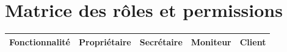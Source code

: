 \documentclass[12pt,a4paper]{article}
\begin{document}
\newpage

\section{Matrice des rôles et permissions}

\renewcommand{\arraystretch}{1.4}
\begin{longtable}{p{4.8cm} >{\centering\arraybackslash}p{2.3cm} >{\centering\arraybackslash}p{2cm} >{\centering\arraybackslash}p{2cm} >{\centering\arraybackslash}p{2cm}}
    \toprule
    \rowcolor{primary}
    {\color{white}\bfseries Fonctionnalité} & {\color{white}\bfseries Propriétaire} & {\color{white}\bfseries Secrétaire} & {\color{white}\bfseries Moniteur} & {\color{white}\bfseries Client} \\
    \midrule
    \endhead


\end{longtable}
\end{document}
